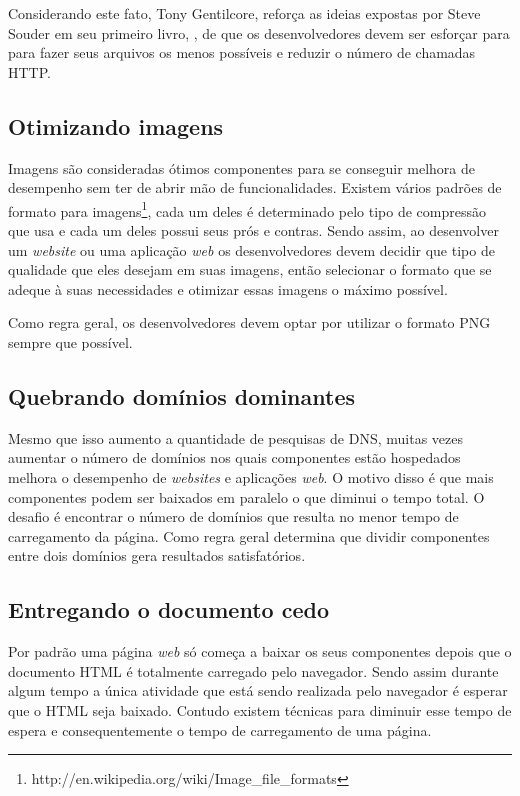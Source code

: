 Considerando este fato, Tony Gentilcore, reforça as ideias expostas por Steve Souder em seu primeiro livro, \cite{HighPerformance}, de que os desenvolvedores devem ser esforçar para para fazer seus arquivos os menos possíveis e reduzir o número de chamadas HTTP.

\subsection{Otimizando imagens}
\label{subsec:evenfaster_cap10}
Imagens são consideradas ótimos componentes para se conseguir melhora de desempenho sem ter de abrir mão de funcionalidades. Existem vários padrões de formato para imagens\footnote{http://en.wikipedia.org/wiki/Image\_file\_formats}, cada um deles é determinado pelo tipo de compressão que usa e cada um deles possui seus prós e contras. Sendo assim, ao desenvolver um \textit{website} ou uma aplicação \textit{web} os desenvolvedores devem decidir que tipo de qualidade que eles desejam em suas imagens, então selecionar o formato que se adeque à suas necessidades e otimizar essas imagens o máximo possível.

Como regra geral, os desenvolvedores devem optar por utilizar o formato PNG sempre que possível.

\subsection{Quebrando domínios dominantes}
\label{subsec:evenfaster_cap11}
Mesmo que isso aumento a quantidade de pesquisas de DNS, muitas vezes aumentar o número de domínios nos quais componentes estão hospedados melhora o desempenho de \textit{websites} e aplicações \textit{web}. O motivo disso é que mais componentes podem ser baixados em paralelo o que diminui o tempo total. O desafio é encontrar o número de domínios que resulta no menor tempo de carregamento da página. Como regra geral \cite[p.~168]{EvenFaster} determina que dividir componentes entre dois domínios gera resultados satisfatórios.

\subsection{Entregando o documento cedo}
\label{subsec:evenfaster_cap12}
Por padrão uma página \textit{web} só começa a baixar os seus componentes depois que o documento HTML é totalmente carregado pelo navegador. Sendo assim durante algum tempo a única atividade que está sendo realizada pelo navegador é esperar que o HTML seja baixado. Contudo existem técnicas para diminuir esse tempo de espera e consequentemente o tempo de carregamento de uma página.

